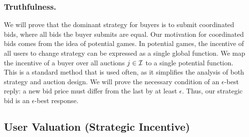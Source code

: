  
\subsubsection{Truthfulness.}
We will prove that the dominant strategy for buyers is to submit coordinated bids,
where all bids the buyer submits are equal. Our motivation for coordinated bids
comes from the idea of potential games. In potential games, the
incentive of all users to change strategy can be expressed as a single global
function. We map the incentive of a buyer over all auctions $j\in\mathcal{I}$ to a
single potential function. This is a standard method that is used often, as it
simplifies the analysis of both strategy and auction design. We will prove the necessary condition of an $\epsilon$-best
reply: a new bid price must differ from the last by at least $\epsilon$.
Thus, our strategic bid is an $\epsilon$-best response.

\subsection{User Valuation (Strategic Incentive)}

